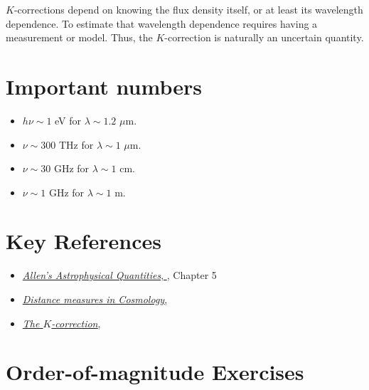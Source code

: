 $K$-corrections depend on knowing the flux density itself, or at least
its wavelength dependence. To estimate that wavelength dependence
requires having a measurement or model. Thus, the $K$-correction is
naturally an uncertain quantity.

\section{Important numbers}

\begin{itemize}
\item $h\nu \sim 1$ eV for $\lambda \sim 1.2$ $\mu$m.
\item $\nu \sim 300$ THz for $\lambda \sim 1$ $\mu$m.
\item $\nu \sim 30$ GHz for $\lambda \sim 1$ cm.
\item $\nu \sim 1$ GHz for $\lambda \sim 1$ m.
\end{itemize}

\section{Key References}

\begin{itemize}
  \item
    \href{http://adsabs.harvard.edu/abs/2000asqu.book.....C}{
    {\it Allen's Astrophysical Quantities},
      \citet{cox00a}}, Chapter 5
  \item
    \href{http://adsabs.harvard.edu/abs/1999astro.ph..5116H}{
    {\it Distance measures in Cosmology},
      \citet{hogg99cosm}}
  \item
    \href{http://adsabs.harvard.edu/abs/2002astro.ph.10394H}{
    {\it The $K$-correction},
      \citet{hogg02c}}
\end{itemize}

\section{Order-of-magnitude Exercises}

